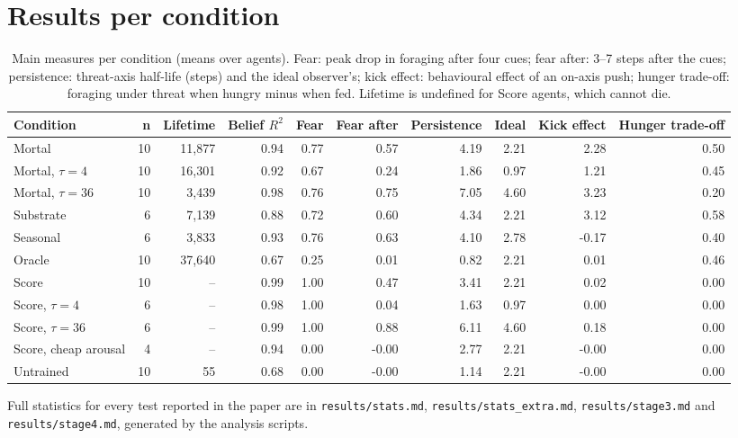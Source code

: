 \section{Results per condition}
\label{app:results}

\begin{table}[h]
\centering\scriptsize\setlength{\tabcolsep}{3.5pt}
\caption{Main measures per condition (means over agents). Fear: peak drop in foraging after four cues; fear after: 3--7 steps after the cues; persistence: threat-axis half-life (steps) and the ideal observer's; kick effect: behavioural effect of an on-axis push; hunger trade-off: foraging under threat when hungry minus when fed. Lifetime is undefined for Score agents, which cannot die.}
\label{tab:percondition}
\begin{tabular}{@{}lrrrrrrrrr@{}}
\toprule
Condition & n & Lifetime & Belief $R^2$ & Fear & Fear after & Persistence & Ideal & Kick effect & Hunger trade-off \\
\midrule
Mortal & 10 & 11,877 & 0.94 & 0.77 & 0.57 & 4.19 & 2.21 & 2.28 & 0.50 \\
Mortal, $\tau=4$ & 10 & 16,301 & 0.92 & 0.67 & 0.24 & 1.86 & 0.97 & 1.21 & 0.45 \\
Mortal, $\tau=36$ & 10 & 3,439 & 0.98 & 0.76 & 0.75 & 7.05 & 4.60 & 3.23 & 0.20 \\
Substrate & 6 & 7,139 & 0.88 & 0.72 & 0.60 & 4.34 & 2.21 & 3.12 & 0.58 \\
Seasonal & 6 & 3,833 & 0.93 & 0.76 & 0.63 & 4.10 & 2.78 & -0.17 & 0.40 \\
Oracle & 10 & 37,640 & 0.67 & 0.25 & 0.01 & 0.82 & 2.21 & 0.01 & 0.46 \\
Score & 10 & -- & 0.99 & 1.00 & 0.47 & 3.41 & 2.21 & 0.02 & 0.00 \\
Score, $\tau=4$ & 6 & -- & 0.98 & 1.00 & 0.04 & 1.63 & 0.97 & 0.00 & 0.00 \\
Score, $\tau=36$ & 6 & -- & 0.99 & 1.00 & 0.88 & 6.11 & 4.60 & 0.18 & 0.00 \\
Score, cheap arousal & 4 & -- & 0.94 & 0.00 & -0.00 & 2.77 & 2.21 & -0.00 & 0.00 \\
Untrained & 10 & 55 & 0.68 & 0.00 & -0.00 & 1.14 & 2.21 & -0.00 & 0.00 \\
\bottomrule
\end{tabular}
\end{table}

{\sloppy Full statistics for every test reported in the paper are in \texttt{results/stats.md}, \texttt{results/stats\_extra.md}, \texttt{results/stage3.md} and \texttt{results/stage4.md}, generated by the analysis scripts.\par}
